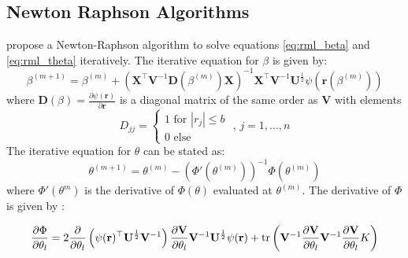 \subsection{Newton Raphson Algorithms}\label{newton-raphson-algorithms}

\textcite{Sin09} propose a Newton-Raphson algorithm to solve equations
\ref{eq:rml_beta} and \ref{eq:rml_theta} iteratively. The iterative
equation for $\beta$ is given by: \[
\beta^{(m+1)} = \beta^{(m)} + \left(\mathbf{X}^\top \mathbf{V}^{-1}\mathbf{D}(\beta^{(m)})\mathbf{X}\right)^{-1}\mathbf{X}^\top\mathbf{V}^{-1}\mathbf{U}^{\frac{1}{2}}\psi(\mathbf{r}(\beta^{(m)}))
\] where
$\mathbf{D}(\beta) = \frac{\partial \psi(\mathbf{r})}{\partial \mathbf{r}}$
is a diagonal matrix of the same order as $\mathbf{V}$ with elements \[
D_{jj} =
\begin{cases}
1 \text{ for } |r_j|\leq b\\
0 \text{ else}
\end{cases}
\text{ , } j = 1, \dots, n
\] The iterative equation for $\theta$ can be stated as: \[
\theta^{(m+1)} = \theta^{(m)} - \left( \Phi'(\theta^{(m)}) \right)^{-1} \Phi(\theta^{(m)})
\] where $\Phi'(\theta^m)$ is the derivative of $\Phi(\theta)$ evaluated
at $\theta^{(m)}$. The derivative of $\Phi$ is given by
\cite[p.53]{Sch12}:

\begin{align}
\label{eq:deriv_Phi_theta}
\frac{\partial\Phi}{\partial\theta_l} = 2\frac{\partial}{\partial\theta_l}\left(\psi(\mathbf{r})^\top\mathbf{U}^{\frac{1}{2}}\mathbf{V}^{-1}\right)\frac{\partial\mathbf{V}}{\partial\theta_l}\mathbf{V}^{-1}\mathbf{U}^{\frac{1}{2}}\psi(\mathbf{r}) + \operatorname{tr}\left(\mathbf{V}^{-1}\frac{\partial\mathbf{V}}{\partial\theta_l}\mathbf{V}^{-1}\frac{\partial\mathbf{V}}{\partial\theta_l} K\right)
\end{align}

